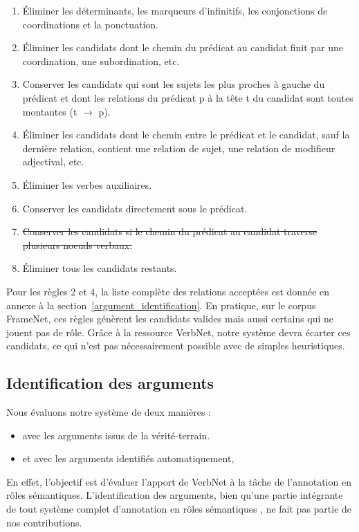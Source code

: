 \begin{enumerate}
    \item Éliminer les déterminants, les marqueurs d'infinitifs, les conjonctions de coordinations et la ponctuation.
    \item Éliminer les candidats dont le chemin du prédicat au candidat finit par une coordination, une subordination, etc.
    \item Conserver les candidats qui sont les sujets les plus proches à gauche du prédicat et dont les relations du prédicat p à la tête t du candidat sont toutes montantes (t $\rightarrow$ p).
    \item Éliminer les candidats  dont le chemin entre le prédicat et le candidat, sauf la dernière relation, contient une relation de sujet, une relation de modifieur adjectival, etc.
    \item Éliminer les verbes auxiliaires.
    \item Conserver les candidats directement sous le prédicat.
    \item \sout{Conserver les candidats si le chemin du prédicat au candidat traverse plusieurs noeuds verbaux.}
    \item Éliminer tous les candidats restants.
\end{enumerate}

Pour les règles 2 et 4, la liste complète des relations acceptées est donnée en
annexe à la section~\ref{argument_identification}. En pratique, sur le corpus
FrameNet, ces règles génèrent les candidats valides mais aussi certains qui ne
jouent pas de rôle. Grâce à la ressource VerbNet, notre système devra écarter
ces candidats, ce qui n'est pas nécessairement possible avec de simples
heuristiques.

\fi

\subsection{Identification des arguments}
\label{argid}

Nous évaluons notre système de deux manières :
\begin{itemize}
    \item avec les arguments issus de la vérité-terrain.
    \item et avec les arguments identifiés automatiquement,
\end{itemize}

En effet, l'objectif est d'évaluer l'apport de VerbNet à la tâche de
l'annotation en rôles sémantiques. L'identification des arguments, bien qu'une
partie intégrante de tout système complet d'annotation en rôles sémantiques
\citep{das2010probabilistic}, ne fait pas partie de nos contributions.

